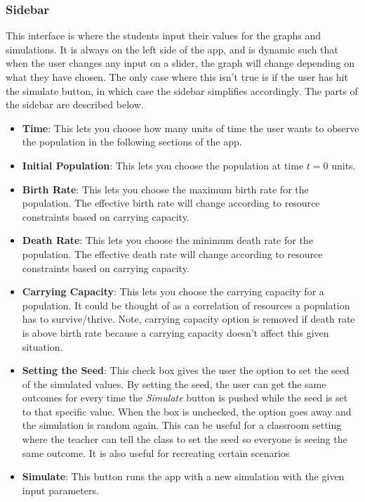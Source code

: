 \documentclass[titlepage]{article}\usepackage[]{graphicx}\usepackage[]{color}
\begin{document}
\subsubsection{Sidebar}

This interface is where the students input their values for the graphs and simulations. It is always on the left side of the app, and is dynamic such that when the user changes any input on a slider, the graph will change depending on what they have chosen. The only case where this isn't true is if the user has hit the simulate button, in which case the sidebar simplifies accordingly. The parts of the sidebar are described below.

\begin{itemize}

\item \textbf{Time}: This lets you choose how many units of time the user wants to observe the population in the following sections of the app.

\item \textbf{Initial Population}: This lets you choose the population at time \(t = 0\) units.

\item \textbf{Birth Rate}: This lets you choose the maximum birth rate for the population. The effective birth rate will change according to resource constraints based on carrying capacity.

\item \textbf{Death Rate}: This lets you choose the minimum death rate for the population. The effective death rate will change according to resource constraints based on carrying capacity.

\item \textbf{Carrying Capacity}: This lets you choose the carrying capacity for a population. It could be thought of as a correlation of resources a population has to survive/thrive. Note, carrying capacity option is removed if death rate is above birth rate because a carrying capacity doesn't affect this given situation.

\item \textbf{Setting the Seed}: This check box gives the user the option to set the seed of the simulated values. By setting the seed, the user can get the same outcomes for every time the \textit{Simulate} button is pushed while the seed is set to that specific value. When the box is unchecked, the option goes away and the simulation is random again. This can be useful for a classroom setting where the teacher can tell the class to set the seed so everyone is seeing the same outcome. It is also useful for recreating certain scenarios

\item \textbf{Simulate}: This button runs the app with a new simulation with the given input parameters.

\end{itemize}
\end{document}

